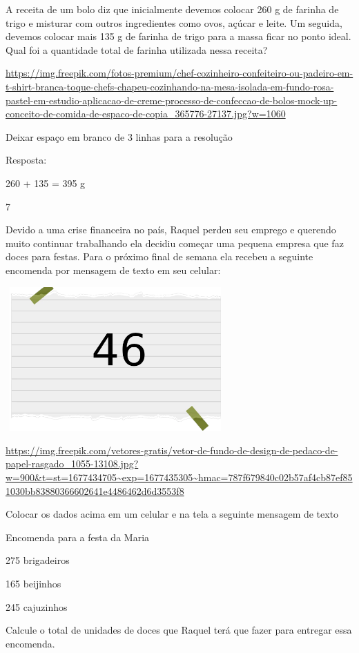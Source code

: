 A receita de um bolo diz que inicialmente devemos colocar 260 g de
farinha de trigo e misturar com outros ingredientes como ovos, açúcar e
leite. Um seguida, devemos colocar mais 135 g de farinha de trigo para a
massa ficar no ponto ideal. Qual foi a quantidade total de farinha
utilizada nessa receita?

\url{https://img.freepik.com/fotos-premium/chef-cozinheiro-confeiteiro-ou-padeiro-em-t-shirt-branca-toque-chefs-chapeu-cozinhando-na-mesa-isolada-em-fundo-rosa-pastel-em-estudio-aplicacao-de-creme-processo-de-confeccao-de-bolos-mock-up-conceito-de-comida-de-espaco-de-copia_365776-27137.jpg?w=1060}

Deixar espaço em branco de 3 linhas para a resolução

Resposta:

260 + 135 = 395 g

\num{7}

Devido a uma crise financeira no país, Raquel perdeu seu emprego e
querendo muito continuar trabalhando ela decidiu começar uma pequena
empresa que faz doces para festas. Para o próximo final de semana ela
recebeu a seguinte encomenda por mensagem de texto em seu celular:

\includegraphics[width=3.30833in,height=2.17391in]{media/image2.png}

\url{https://img.freepik.com/vetores-gratis/vetor-de-fundo-de-design-de-pedaco-de-papel-rasgado_1055-13108.jpg?w=900\&t=st=1677434705~exp=1677435305~hmac=787f679840c02b57af4cb87ef851030bb83880366602641e4486462d6d3553f8}

Colocar os dados acima em um celular e na tela a seguinte mensagem de
texto

Encomenda para a festa da Maria

275 brigadeiros

165 beijinhos

245 cajuzinhos

Calcule o total de unidades de doces que Raquel terá que fazer para
entregar essa encomenda.

